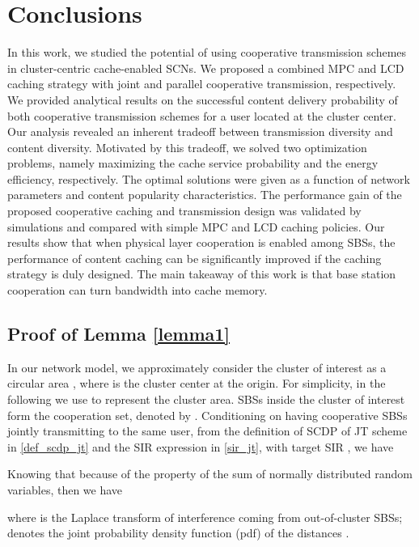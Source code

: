 \documentclass[twocolumns,10pt]{IEEEtran}
\begin{document}
\section{Conclusions}
\label{conclusion}
In this work, we studied the potential of using cooperative transmission schemes in cluster-centric cache-enabled SCNs. We proposed a combined MPC and LCD caching strategy with joint and parallel cooperative transmission, respectively. We provided analytical results on the successful content delivery probability of both cooperative transmission schemes for a user located at the cluster center. Our analysis revealed an inherent tradeoff between transmission diversity and content diversity. Motivated by this tradeoff, we solved two optimization problems, namely maximizing the cache service probability and the energy efficiency, respectively. The optimal solutions were given as a function of network parameters and content popularity characteristics. The performance gain of the proposed cooperative caching and transmission design was validated by simulations and compared with simple MPC and LCD caching policies. Our results show that when physical layer cooperation is enabled among SBSs, the performance of content caching can be significantly improved if the caching strategy is duly designed. The main takeaway of this work is that base station cooperation can turn bandwidth into cache memory. 

 
 
\appendix
\appendices
\subsection{Proof of Lemma \ref{lemma1} }
\label{appen1}
In our network model, we approximately consider the cluster of interest as a circular area  , where  is the cluster center at the origin. For simplicity, in the following we use  to represent the cluster area. SBSs inside the cluster of interest form the cooperation set, denoted by . Conditioning on having  cooperative SBSs jointly transmitting to the same user,  from the definition of SCDP of JT scheme in \eqref{def_scdp_jt} and the SIR expression in  \eqref{sir_jt}, with target SIR , we have  

Knowing that  because of the property of the sum of normally distributed random variables, then we have 
 
where  is the Laplace transform of interference coming from out-of-cluster SBSs;  denotes the joint probability density function (pdf) of the distances  . 
\end{document}
